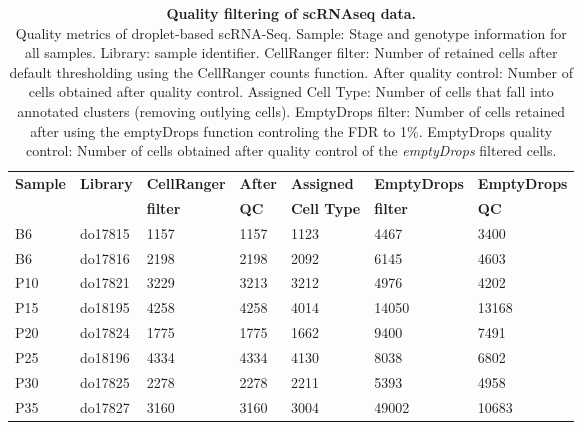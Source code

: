 \begin{table}[ht	]
\centering
\caption[Quality filtering of scRNAseq data]{\textbf{Quality filtering of scRNAseq data.} \\
Quality metrics of droplet-based scRNA-Seq. Sample: Stage and genotype information for all samples. Library: sample identifier. CellRanger filter: Number of retained cells after default thresholding using the CellRanger counts function.  After quality control: Number of cells obtained after quality control. Assigned Cell Type: Number of cells that fall into annotated clusters (removing outlying cells). EmptyDrops filter: Number of cells retained after using the emptyDrops function controling the FDR to 1\%. EmptyDrops quality control: Number of cells obtained after quality control of the \emph{emptyDrops} filtered cells.}
\label{tab3:QC_scRNAseq}
\begin{tabular}{lllllll}
\toprule
\textbf{Sample} & \textbf{Library} & \textbf{CellRanger} & \textbf{After} & \textbf{Assigned} & \textbf{EmptyDrops} & \textbf{EmptyDrops} \\
& & \textbf{filter} & \textbf{QC} & \textbf{Cell Type} & \textbf{filter} & \textbf{QC} \\
\midrule
B6     & do17815 & 1157              & 1157                  & 1123               & 4467              & 3400                       \\
\midrule
B6     & do17816 & 2198              & 2198                  & 2092               & 6145              & 4603                       \\
\midrule
P10    & do17821 & 3229              & 3213                  & 3212               & 4976              & 4202                       \\
\midrule
P15    & do18195 & 4258              & 4258                  & 4014               & 14050             & 13168                      \\
\midrule
P20    & do17824 & 1775              & 1775                  & 1662               & 9400              & 7491                       \\
\midrule
P25    & do18196 & 4334              & 4334                  & 4130               & 8038              & 6802                       \\
\midrule
P30    & do17825 & 2278              & 2278                  & 2211               & 5393              & 4958                       \\
\midrule
P35    & do17827 & 3160              & 3160                  & 3004               & 49002             & 10683                      \\                 
\bottomrule   
\end{tabular}
\end{table}

